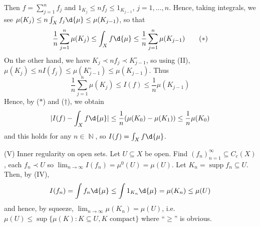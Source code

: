 \documentclass[11pt, a4paper]{memoir}
\DeclareMathOperator{\N}{{\mathbb{N}}}
\theoremstyle{change}
\theoremstyle{plain}
\theoremstyle{nonumberplain}
\DeclareMathOperator{\supp}{supp}
\begin{document}
Then $f=\sum_{j=1}^n f_j$ and $1_{K_j}\leq nf_j\leq 1_{K_{j-1}}$, $j=1,\ldots,n$.
Hence, taking integrals, we see $\mu(K_j)\leq n\int_X f_j\d{\mu}\leq \mu(K_{j-1})$, so that
\begin{equation*}
    \frac{1}{n}\sum_{j=1}^n\mu(K_j)\leq \int_X f\d{\mu}\leq\frac{1}{n}\sum_{j=1}^n\mu(K_{j-1})\tag{$*$}
\end{equation*}
On the other hand, we have $K_j\prec nf_j\prec K_{j-1}^\circ$, so using (II), $\mu(K_j)\leq nI(f_j)\leq\mu(K_{j-1}^\circ)\leq\mu(K_{j-1})$.
Thus
\begin{equation*}
    \frac{1}{n}\sum_{j=1}^n\mu(K_j)\leq I(f)\leq\frac{1}{n}\mu(K_{j-1})\tag{$\dagger$}
\end{equation*}
Hence, by ($*$) and ($\dagger$), we obtain
\begin{equation*}
    |I(f)-\int_X f\d{\mu}|\leq\frac{1}{n}(\mu(K_0)-\mu(K_1))\leq\frac{1}{n}\mu(K_0)
\end{equation*}
and this holds for any $n\in\N$, so $I(f)=\int_X f\d{\mu}$.

(V) Inner regularity on open sets.
Let $U\subseteq X$ be open.
Find $(f_n)_{n=1}^\infty\subseteq C_c(X)$, each $f_n\prec U$ so $\lim_{n\to\infty}I(f_n)=\mu^0(U)=\mu(U)$.
Let $K_n=\supp f_n\subseteq U$.
Then, by (IV),
\begin{equation*}
    I(f_n)=\int f_n\d{\mu}\leq\int 1_{K_n}\d{\mu}=\mu(K_n)\leq \mu(U)
\end{equation*}
and hence, by squeeze, $\lim_{n\to\infty}\mu(K_n)=\mu(U)$, i.e. $\mu(U)\leq\sup\{\mu(K):K\subseteq U,K\text{ compact}\}$ where ``$\geq$'' is obvious.
\end{document}
